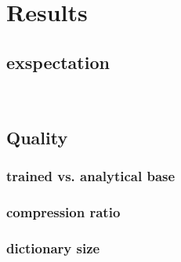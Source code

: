 \chapter{Results}
\section{exspectation}
\
\section{Quality}
\subsection{trained vs. analytical base}
\subsection{compression ratio}
\subsection{dictionary size}




